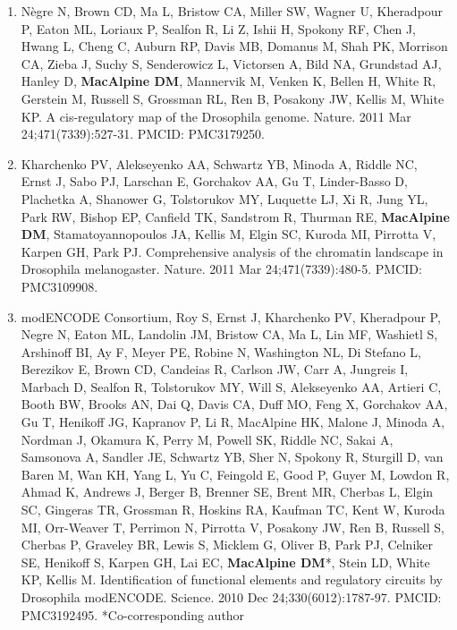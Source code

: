 \documentclass{nihbiosketch}
\begin{document}
\begin{enumerate}
\begin{enumerate}
\item Nègre N, Brown CD, Ma L, Bristow CA, Miller SW, Wagner U, Kheradpour P, Eaton ML, Loriaux P, Sealfon R, Li Z, Ishii H, Spokony RF, Chen J, Hwang L, Cheng C, Auburn RP, Davis MB, Domanus M, Shah PK, Morrison CA, Zieba J, Suchy S, Senderowicz L, Victorsen A, Bild NA, Grundstad AJ, Hanley D, \textbf{MacAlpine DM}, Mannervik M, Venken K, Bellen H, White R, Gerstein M, Russell S, Grossman RL, Ren B, Posakony JW, Kellis M, White KP. A cis-regulatory map of the Drosophila genome. Nature. 2011 Mar 24;471(7339):527-31. PMCID: PMC3179250.

\item Kharchenko PV, Alekseyenko AA, Schwartz YB, Minoda A, Riddle NC, Ernst J, Sabo PJ, Larschan E, Gorchakov AA, Gu T, Linder-Basso D, Plachetka A, Shanower G, Tolstorukov MY, Luquette LJ, Xi R, Jung YL, Park RW, Bishop EP, Canfield TK, Sandstrom R, Thurman RE, \textbf{MacAlpine DM}, Stamatoyannopoulos JA, Kellis M, Elgin SC, Kuroda MI, Pirrotta V, Karpen GH, Park PJ. Comprehensive analysis of the chromatin landscape in Drosophila melanogaster. Nature. 2011 Mar 24;471(7339):480-5. PMCID: PMC3109908.

\item modENCODE Consortium, Roy S, Ernst J, Kharchenko PV, Kheradpour P, Negre N, Eaton ML, Landolin JM, Bristow CA, Ma L, Lin MF, Washietl S, Arshinoff BI, Ay F, Meyer PE, Robine N, Washington NL, Di Stefano L, Berezikov E, Brown CD, Candeias R, Carlson JW, Carr A, Jungreis I, Marbach D, Sealfon R, Tolstorukov MY, Will S, Alekseyenko AA, Artieri C, Booth BW, Brooks AN, Dai Q, Davis CA, Duff MO, Feng X, Gorchakov AA, Gu T, Henikoff JG, Kapranov P, Li R, MacAlpine HK, Malone J, Minoda A, Nordman J, Okamura K, Perry M, Powell SK, Riddle NC, Sakai A, Samsonova A, Sandler JE, Schwartz YB, Sher N, Spokony R, Sturgill D, van Baren M, Wan KH, Yang L, Yu C, Feingold E, Good P, Guyer M, Lowdon R, Ahmad K, Andrews J, Berger B, Brenner SE, Brent MR, Cherbas L, Elgin SC, Gingeras TR, Grossman R, Hoskins RA, Kaufman TC, Kent W, Kuroda MI, Orr-Weaver T, Perrimon N, Pirrotta V, Posakony JW, Ren B, Russell S, Cherbas P, Graveley BR, Lewis S, Micklem G, Oliver B, Park PJ, Celniker SE, Henikoff S, Karpen GH, Lai EC, \textbf{MacAlpine DM}*, Stein LD, White KP, Kellis M. Identification of functional elements and regulatory circuits by Drosophila modENCODE. Science. 2010 Dec 24;330(6012):1787-97. PMCID: PMC3192495. *Co-corresponding author

\end{enumerate}


\end{enumerate}
\end{document}
